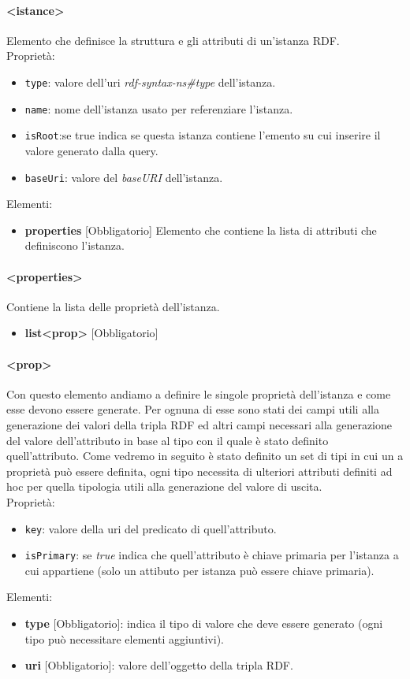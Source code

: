 \documentclass[12pt,a4paper,italian]{article}
\begin{document}
\paragraph{\large{<istance>}}
Elemento che definisce la struttura e gli attributi di un'istanza RDF.\\
Proprietà:
\begin{itemize}
	\item \texttt{type}: valore dell'uri \emph{rdf-syntax-ns\#type} dell'istanza.
	\item \texttt{name}: nome dell'istanza usato per referenziare l'istanza.
	\item \texttt{isRoot}:se true indica se questa istanza contiene l'emento su cui inserire il valore generato dalla query.
	\item \texttt{baseUri}: valore del \emph{baseURI} dell'istanza.
\end{itemize}
Elementi:
\begin{itemize}
	\item \textbf{properties} [Obbligatorio] Elemento che contiene la lista di attributi che definiscono l'istanza.
\end{itemize}
\paragraph{\large{<properties>}}
Contiene la lista delle proprietà dell'istanza.
\begin{itemize}
	\item \textbf{list<prop>} [Obbligatorio]
\end{itemize}

\paragraph{\large{<prop>}}
Con questo elemento andiamo a definire le singole proprietà dell'istanza e come esse devono essere generate. Per ognuna di esse sono stati dei campi utili alla generazione dei valori della tripla RDF 
ed altri campi necessari alla generazione del valore dell'attributo in base al tipo con il quale è stato definito quell'attributo. Come vedremo in seguito è stato definito un set di tipi in cui un a proprietà può essere
definita, ogni tipo necessita di ulteriori attributi definiti ad hoc per quella tipologia utili alla generazione del valore di uscita.\\
Proprietà:
\begin{itemize}
\item \texttt{key}: valore della uri del predicato di quell'attributo.
\item \texttt{isPrimary}: se \emph{true} indica che quell'attributo è chiave primaria per l'istanza a cui appartiene (solo un attibuto per istanza può essere chiave primaria).
\end{itemize}
Elementi:
\begin{itemize}
\item \textbf{type} [Obbligatorio]: indica il tipo di valore che deve essere generato (ogni tipo può necessitare elementi aggiuntivi).
\item \textbf{uri} [Obbligatorio]: valore dell'oggetto della tripla RDF.
\end{itemize}
\end{document}
